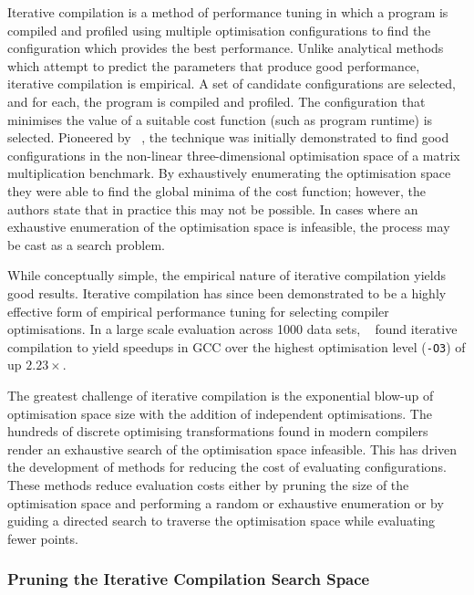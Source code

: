 Iterative compilation is a method of performance tuning in which a program is compiled and profiled using multiple optimisation configurations to find the configuration which provides the best performance. Unlike analytical methods which attempt to predict the parameters that produce good performance, iterative compilation is empirical. A set of candidate configurations are selected, and for each, the program is compiled and profiled. The configuration that minimises the value of a suitable cost function (such as program runtime) is selected. Pioneered by \citeauthor{Bodin1998}~\cite{Bodin1998}, the technique was initially demonstrated to find good configurations in the non-linear three-dimensional optimisation space of a matrix multiplication benchmark. By exhaustively enumerating the optimisation space they were able to find the global minima of the cost function; however, the authors state that in practice this may not be possible. In cases where an exhaustive enumeration of the optimisation space is infeasible, the process may be cast as a search problem.

While conceptually simple, the empirical nature of iterative compilation yields good results. Iterative compilation has since been demonstrated to be a highly effective form of empirical performance tuning for selecting compiler optimisations. In a large scale evaluation across 1000 data sets, \citeauthor{Chen2010}~\cite{Chen2010} found iterative compilation to yield speedups in GCC over the highest optimisation level (\texttt{-O3}) of up $2.23\times$.

The greatest challenge of iterative compilation is the exponential blow-up of optimisation space size with the addition of independent optimisations. The hundreds of discrete optimising transformations found in modern compilers render an exhaustive search of the optimisation space infeasible. This has driven the development of methods for reducing the cost of evaluating configurations. These methods reduce evaluation costs either by pruning the size of the optimisation space and performing a random or exhaustive enumeration or by guiding a directed search to traverse the optimisation space while evaluating fewer points.


\subsubsection{Pruning the Iterative Compilation Search Space}

